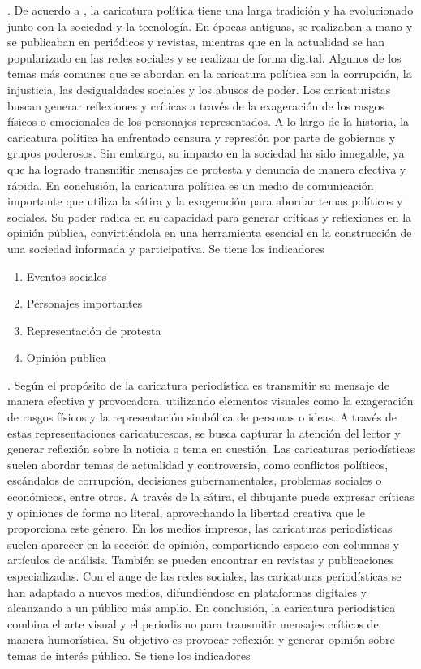 \documentclass[12pt,a4paper]{article}
\begin{document}
\noindent\textbf{\dimiii}.	De acuerdo a \cite{grose_principios_2011}, la caricatura política tiene una larga tradición y ha evolucionado junto con la sociedad y la tecnología. En épocas antiguas, se realizaban a mano y se publicaban en periódicos y revistas, mientras que en la actualidad se han popularizado en las redes sociales y se realizan de forma digital.
Algunos de los temas más comunes que se abordan en la caricatura política son la corrupción, la injusticia, las desigualdades sociales y los abusos de poder. Los caricaturistas buscan generar reflexiones y críticas a través de la exageración de los rasgos físicos o emocionales de los personajes representados.
A lo largo de la historia, la caricatura política ha enfrentado censura y represión por parte de gobiernos y grupos poderosos. Sin embargo, su impacto en la sociedad ha sido innegable, ya que ha logrado transmitir mensajes de protesta y denuncia de manera efectiva y rápida.
En conclusión, la caricatura política es un medio de comunicación importante que utiliza la sátira y la exageración para abordar temas políticos y sociales. Su poder radica en su capacidad para generar críticas y reflexiones en la opinión pública, convirtiéndola en una herramienta esencial en la construcción de una sociedad informada y participativa. Se tiene los indicadores

\begin{enumerate}
	\item  Eventos sociales
	\item  Personajes importantes
	\item  Representación de protesta
	\item  Opinión publica
\end{enumerate}

\noindent\textbf{\dimiiii}. Según \cite{gray_caricaturas_2015}	el propósito de la caricatura periodística es transmitir su mensaje de manera efectiva y provocadora, utilizando elementos visuales como la exageración de rasgos físicos y la representación simbólica de personas o ideas. A través de estas representaciones caricaturescas, se busca capturar la atención del lector y generar reflexión sobre la noticia o tema en cuestión.
Las caricaturas periodísticas suelen abordar temas de actualidad y controversia, como conflictos políticos, escándalos de corrupción, decisiones gubernamentales, problemas sociales o económicos, entre otros. A través de la sátira, el dibujante puede expresar críticas y opiniones de forma no literal, aprovechando la libertad creativa que le proporciona este género.
En los medios impresos, las caricaturas periodísticas suelen aparecer en la sección de opinión, compartiendo espacio con columnas y artículos de análisis. También se pueden encontrar en revistas y publicaciones especializadas. Con el auge de las redes sociales, las caricaturas periodísticas se han adaptado a nuevos medios, difundiéndose en plataformas digitales y alcanzando a un público más amplio.
En conclusión, la caricatura periodística combina el arte visual y el periodismo para transmitir mensajes críticos de manera humorística. Su objetivo es provocar reflexión y generar opinión sobre temas de interés público. Se tiene los indicadores
\end{document}
